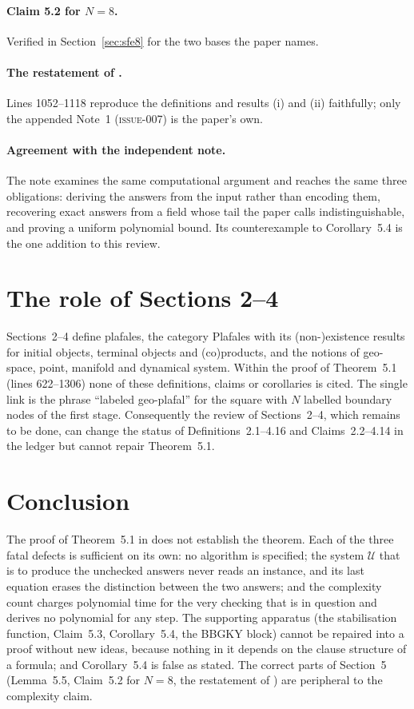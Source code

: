 \documentclass[11pt,a4paper]{article}
\newcommand{\issue}[1]{\textrm{\mdseries\textsc{issue-#1}}}
\begin{document}
\paragraph{Claim 5.2 for $N=8$.} Verified in Section~\ref{sec:sfe8} for the two bases the paper names.

\paragraph{The restatement of \cite{stepanets}.} Lines 1052--1118 reproduce the definitions and results (i) and (ii) faithfully; only the appended Note~1 (\issue{007}) is the paper's own.

\paragraph{Agreement with the independent note.} The note \cite{note} examines the same computational argument and reaches the same three obligations: deriving the answers from the input rather than encoding them, recovering exact answers from a field whose tail the paper calls indistinguishable, and proving a uniform polynomial bound. Its counterexample to Corollary~5.4 is the one addition to this review.

\section{The role of Sections 2--4}
\label{sec:role24}

Sections~2--4 define plafales, the category \textsf{Plafales} with its (non-)existence results for initial objects, terminal objects and (co)products, and the notions of geo-space, point, manifold and dynamical system. Within the proof of Theorem~5.1 (lines 622--1306) none of these definitions, claims or corollaries is cited. The single link is the phrase ``labeled geo-plafal'' for the square with $N$ labelled boundary nodes of the first stage. Consequently the review of Sections~2--4, which remains to be done, can change the status of Definitions~2.1--4.16 and Claims~2.2--4.14 in the ledger but cannot repair Theorem~5.1.

\section{Conclusion}

The proof of Theorem~5.1 in \cite{topchyi} does not establish the theorem. Each of the three fatal defects is sufficient on its own: no algorithm is specified; the system $\mathcal U$ that is to produce the unchecked answers never reads an instance, and its last equation erases the distinction between the two answers; and the complexity count charges polynomial time for the very checking that is in question and derives no polynomial for any step. The supporting apparatus (the stabilisation function, Claim~5.3, Corollary~5.4, the BBGKY block) cannot be repaired into a proof without new ideas, because nothing in it depends on the clause structure of a formula; and Corollary~5.4 is false as stated. The correct parts of Section~5 (Lemma~5.5, Claim~5.2 for $N=8$, the restatement of \cite{stepanets}) are peripheral to the complexity claim.
\end{document}
